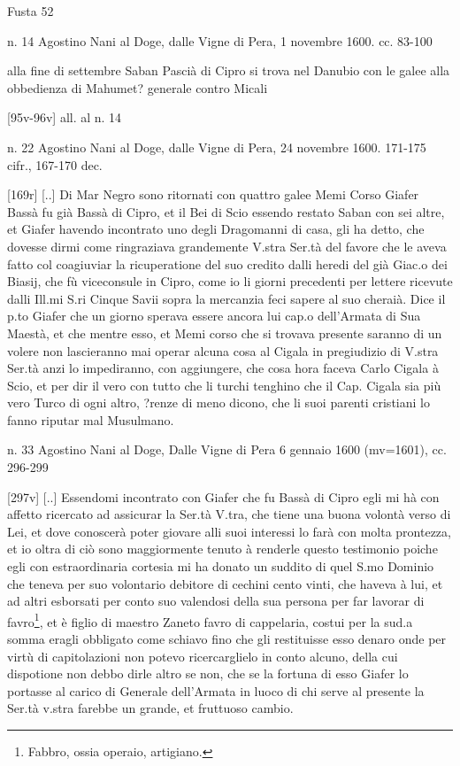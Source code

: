 Fusta 52

n. 14 Agostino  Nani al  Doge,  dalle  Vigne  di Pera,  1  novembre
1600. cc. 83-100

{alla fine di settembre Saban Pascià di Cipro si trova nel Danubio con
  le  galee  alla  obbedienza  di  Mahumet?  generale  contro  Micali}

[95v-96v] all. al n. 14

n.  22  Agostino  Nani al  Doge,  dalle  Vigne  di Pera,  24  novembre
1600. 171-175 cifr., 167-170 dec.

[169r] [..] Di  Mar Negro sono ritornati con  quattro galee Memi Corso
Giafer Bassà fu già Bassà di  Cipro, et il Bei di Scio essendo restato
Saban con sei altre, et Giafer havendo incontrato uno degli Dragomanni
di casa, gli ha detto,  che dovesse dirmi come ringraziava grandemente
V.stra  Ser.tà  del  favore  che  le aveva  fatto  col  coagiuviar  la
ricuperatione del suo credito dalli  heredi del già Giac.o dei Biasij,
che fù viceconsule in Cipro,  come io li giorni precedenti per lettere
ricevute dalli Ill.mi S.ri Cinque Savii sopra la mercanzia feci sapere
al  suo cheraià.  Dice  il p.to  Giafer che  un giorno  sperava essere
ancora lui  cap.o dell'Armata  di Sua Maestà,  et che mentre  esso, et
Memi  corso  che  si  trovava   presente  saranno  di  un  volere  non
lascieranno mai operar alcuna cosa  al Cigala in pregiudizio di V.stra
Ser.tà anzi lo impediranno, con aggiungere, che cosa hora faceva Carlo
Cigala à Scio, et per dir il vero con tutto che li turchi tenghino che
il  Cap. Cigala  sia più  vero  Turco di  ogni altro,  ?renze di  meno
dicono, che li suoi parenti cristiani lo fanno riputar mal Musulmano.

n.  33 Agostino  Nani al  Doge,  Dalle Vigne  di Pera  6 gennaio  1600
(mv=1601), cc.  296-299

[297v] [..] Essendomi incontrato con Giafer che fu Bassà di Cipro egli
mi hà  con affetto ricercato ad  assicurar la Ser.tà  V.tra, che tiene
una buona volontà  verso di Lei, et dove  conoscerà poter giovare alli
suoi interessi  lo farà con molta  prontezza, et io oltra  di ciò sono
maggiormente  tenuto  à renderle  questo  testimonio  poiche egli  con
estraordinaria cortesia mi  ha donato un suddito di  quel S.mo Dominio
che teneva  per suo  volontario debitore di  cechini cento  vinti, che
haveva à lui, et ad altri  esborsati per conto suo valendosi della sua
persona  per  far  lavorar  di favro\footnote{Fabbro,  ossia  operaio,
  artigiano.},  et è  figlio di  maestro Zaneto  favro  di cappelaria,
costui per la  sud.a somma eragli obbligato come  schiavo fino che gli
restituisse  esso denaro onde  per virtù  di capitolazioni  non potevo
ricercarglielo in  conto alcuno, della cui dispotione  non debbo dirle
altro se non,  che se la fortuna di esso Giafer  lo portasse al carico
di Generale  dell'Armata in luoco di  chi serve al  presente la Ser.tà
v.stra farebbe un grande, et fruttuoso cambio.


